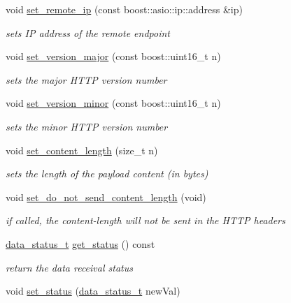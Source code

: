 \begin{DoxyCompactItemize}
void \hyperlink{classpion_1_1http_1_1message_a476f852158ecaefef8f3e93a84e1f76a}{set\-\_\-remote\-\_\-ip} (const boost\-::asio\-::ip\-::address \&ip)
\begin{DoxyCompactList}\small\item\em sets I\-P address of the remote endpoint \end{DoxyCompactList}\item 
void \hyperlink{classpion_1_1http_1_1message_aab454a1ce4eebd904b8ee7fff3dbe5d9}{set\-\_\-version\-\_\-major} (const boost\-::uint16\-\_\-t n)
\begin{DoxyCompactList}\small\item\em sets the major H\-T\-T\-P version number \end{DoxyCompactList}\item 
void \hyperlink{classpion_1_1http_1_1message_a311e93b0818ec735a4933e825a55c12e}{set\-\_\-version\-\_\-minor} (const boost\-::uint16\-\_\-t n)
\begin{DoxyCompactList}\small\item\em sets the minor H\-T\-T\-P version number \end{DoxyCompactList}\item 
void \hyperlink{classpion_1_1http_1_1message_a81612c01ac85ebe08b947b1f9cfc2a75}{set\-\_\-content\-\_\-length} (size\-\_\-t n)
\begin{DoxyCompactList}\small\item\em sets the length of the payload content (in bytes) \end{DoxyCompactList}\item 
void \hyperlink{classpion_1_1http_1_1message_af6cf5b229cacaaec5ea2bac0df53e199}{set\-\_\-do\-\_\-not\-\_\-send\-\_\-content\-\_\-length} (void)
\begin{DoxyCompactList}\small\item\em if called, the content-\/length will not be sent in the H\-T\-T\-P headers \end{DoxyCompactList}\item 
\hyperlink{classpion_1_1http_1_1message_ab71e06f72cacb4945dbf84663b0420e9}{data\-\_\-status\-\_\-t} \hyperlink{classpion_1_1http_1_1message_aabb2581095e035b5b274ee88442ad9ed}{get\-\_\-status} () const 
\begin{DoxyCompactList}\small\item\em return the data receival status \end{DoxyCompactList}\item 
void \hyperlink{classpion_1_1http_1_1message_ad24b94c3ad437b2044c2658fa34bd78d}{set\-\_\-status} (\hyperlink{classpion_1_1http_1_1message_ab71e06f72cacb4945dbf84663b0420e9}{data\-\_\-status\-\_\-t} new\-Val)

\end{DoxyCompactItemize}

